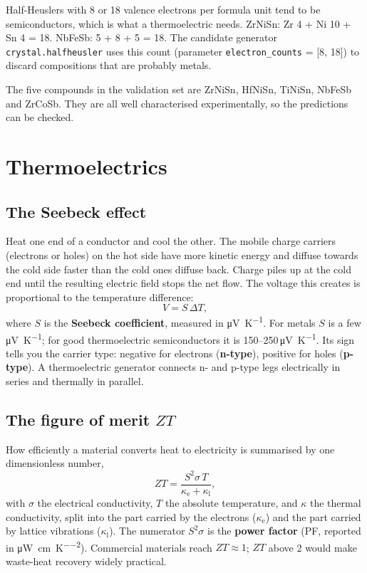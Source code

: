 \documentclass[11pt,a4paper]{report}
\newcommand{\code}[1]{\texttt{#1}}
\newcommand{\kl}{\kappa_\mathrm{l}}
\newcommand{\ke}{\kappa_\mathrm{e}}
\begin{document}
\begin{keyidea}
Half-Heuslers with 8 or 18 valence electrons per formula unit tend to be semiconductors,
which is what a thermoelectric needs. ZrNiSn: Zr 4 + Ni 10 + Sn 4 = 18. NbFeSb: 5 + 8 + 5 = 18.
The candidate generator \code{crystal.halfheusler} uses this count (parameter
\code{electron\_counts} = [8, 18]) to discard compositions that are probably metals.
\end{keyidea}

The five compounds in the validation set are ZrNiSn, HfNiSn, TiNiSn, NbFeSb and ZrCoSb. They
are all well characterised experimentally, so the predictions can be checked.

\chapter{Thermoelectrics}

\section{The Seebeck effect}

Heat one end of a conductor and cool the other. The mobile charge carriers (electrons or
holes) on the hot side have more kinetic energy and diffuse towards the cold side faster than
the cold ones diffuse back. Charge piles up at the cold end until the resulting electric field
stops the net flow. The voltage this creates is proportional to the temperature difference:
\begin{equation}
  V = S\,\Delta T,
\end{equation}
where $S$ is the \textbf{Seebeck coefficient}, measured in \si{\micro\volt\per\kelvin}. For
metals $S$ is a few \si{\micro\volt\per\kelvin}; for good thermoelectric semiconductors it is
150--250\,\si{\micro\volt\per\kelvin}. Its sign tells you the carrier type: negative for
electrons (\textbf{n-type}), positive for holes (\textbf{p-type}). A thermoelectric generator
connects n- and p-type legs electrically in series and thermally in parallel.

\section{The figure of merit $ZT$}

How efficiently a material converts heat to electricity is summarised by one dimensionless
number,
\begin{equation}
  ZT = \frac{S^2\sigma\,T}{\ke+\kl},
\end{equation}
with $\sigma$ the electrical conductivity, $T$ the absolute temperature, and $\kappa$ the thermal
conductivity, split into the part carried by the electrons ($\ke$) and the part carried by
lattice vibrations ($\kl$). The numerator $S^2\sigma$ is the \textbf{power factor} (PF,
reported in \si{\micro\watt\per\centi\metre\per\kelvin\squared}). Commercial materials reach
$ZT\approx1$; $ZT$ above 2 would make waste-heat recovery widely practical.
\end{document}
